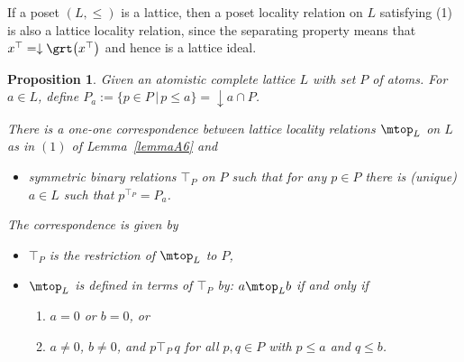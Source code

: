 \documentclass[10pt,a4paper]{amsart}
\numberwithin{equation}{section}
\newtheorem{Proposition}[Theorem]{Proposition}
\begin{document}
\begin{Remark} \label{rk:posetltt}
If a poset $(L,\leq)$ is a lattice, then a poset locality relation on $L$ satisfying (1) is also a lattice locality relation, since the separating property means that $x^\top=\downarrow \grt\big(x^\top\big)$ and hence is a lattice ideal.
\end{Remark}
\begin{Proposition}
	Given an atomistic complete lattice $L$ with set $P$ of atoms.
	For $a\in L$, define $P_a:=\{p\in P\,|\, p\leq a\}=\downarrow a \cap P$.
	
	There is a one-one correspondence between lattice locality relations $\mtop_L$ on $L$ as in $(1)$ of Lemma~{\rm \ref{lemmaA6}} and
	\begin{itemize}\itemsep=0pt
		\item [$(3)$] symmetric binary relations $\top_P$ on $P$ such that for any $p\in P$ there is (unique) $a\in L$ such that $p^{\top_P}=P_a$.
	\end{itemize}
The correspondence is given by
	\begin{itemize}\itemsep=0pt
		\item $\top_P$ is the restriction of $\mtop_L$ to $P$,
		\item $\mtop_L$ is defined in terms of $\top_P$ by: $a\mtop_L b$ if and only if
		\begin{enumerate}\itemsep=0pt
\item $a=0$ or $b=0$, or

\item $a\neq 0$, $b\neq 0$, and $p\top_P\, q$ for all $p, q\in P$ with $p\leq a$ and $q\leq b$.
		\end{enumerate}
	\end{itemize}
\end{Proposition}
\end{document}
